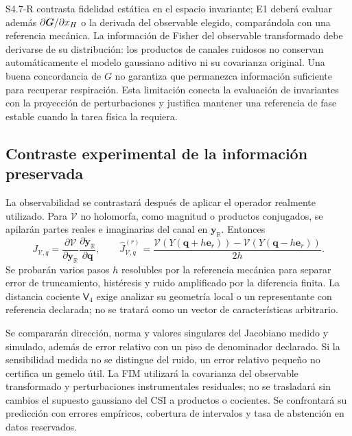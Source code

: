 S4.7-R contrasta fidelidad estática en el espacio invariante; E1 deberá evaluar
además $\partial\bm{G}/\partial x_H$ o la derivada del observable elegido,
comparándola con una referencia mecánica. La información de Fisher del observable
transformado debe derivarse de su distribución: los productos de canales
ruidosos no conservan automáticamente el modelo gaussiano aditivo ni su
covarianza original. Una buena concordancia de $G$ no garantiza que permanezca
información suficiente para recuperar respiración. Esta limitación conecta
la evaluación de invariantes con la proyección de perturbaciones y justifica
mantener una referencia de fase estable cuando la tarea física la requiera.

\subsection{Contraste experimental de la información preservada}
\label{sec:observable_jacobian_test}

La observabilidad se contrastará después de aplicar el operador realmente utilizado.
Para $\mathcal V$ no holomorfa, como magnitud o productos conjugados, se apilarán
partes reales e imaginarias del canal en $\mathbf y_{\mathbb R}$. Entonces
\begin{equation}
J_{\mathcal V,q}=\frac{\partial\mathcal V}{\partial\mathbf y_{\mathbb R}}
\frac{\partial\mathbf y_{\mathbb R}}{\partial\mathbf q},\qquad
\widehat J_{\mathcal V,q}^{(r)}=
\frac{\mathcal V(Y(\mathbf q+h\mathbf e_r))-
\mathcal V(Y(\mathbf q-h\mathbf e_r))}{2h}.
\label{eq:observable_real_jacobian}
\end{equation}
Se probarán varios pasos $h$ resolubles por la referencia mecánica para separar
error de truncamiento, histéresis y ruido amplificado por la diferencia finita.
La distancia cociente $\mathsf V_4$ exige analizar su geometría local o un representante
con referencia declarada; no se tratará como un vector de características arbitrario.

Se compararán dirección, norma y valores singulares del Jacobiano medido y simulado,
además de error relativo con un piso de denominador declarado. Si la sensibilidad
medida no se distingue del ruido, un error relativo pequeño no certifica un gemelo
útil. La FIM utilizará la covarianza del observable transformado y perturbaciones
instrumentales residuales; no se trasladará sin cambios el supuesto gaussiano del
CSI a productos o cocientes. Se confrontará su predicción con errores empíricos,
cobertura de intervalos y tasa de abstención en datos reservados.

